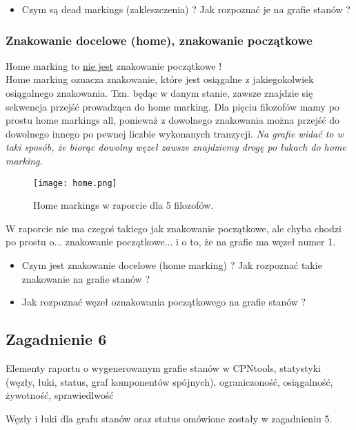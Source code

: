 \documentclass[a4paper,15pt]{article}
\newcommand{\question}[2]{
    \begin{tcolorbox}[colback=black!5!white,colframe=black,title={Zagadnienie #1}]
        #2
    \end{tcolorbox}
}
\begin{document}
\begin{framed}
\begin{itemize}
\item Czym są dead markings (zakleszczenia) ? Jak rozpoznać je na grafie stanów ?
\end{itemize}
\end{framed}


\subsubsection{Znakowanie docelowe (home), znakowanie początkowe}
Home marking to \underline{nie jest} znakowanie początkowe ! \\
Home marking oznacza znakowanie, które jest osiągalne z jakiegokolwiek osiągalnego znakowania. Tzn. będąc w danym stanie, zawsze znajdzie się sekwencja przejść prowadząca do home marking. Dla pięciu filozofów mamy po prostu home markings all, ponieważ z dowolnego znakowania można przejść do dowolnego innego po pewnej liczbie wykonanych tranzycji. \textit{Na grafie widać to w taki sposób, że biorąc dowolny węzeł zawsze znajdziemy drogę po łukach do home marking}.
\begin{figure}[H]
\centerline{\texttt{[image: home.png]}}
\caption{Home markings w raporcie dla 5 filozofów.}
\label{fig:home}
\end{figure}
W raporcie nie ma czegoś takiego jak znakowanie początkowe, ale chyba chodzi po prostu o... znakowanie początkowe... i o to, że na grafie ma węzeł numer 1.

\begin{framed}
\begin{itemize}
\item Czym jest znakowanie docelowe (home marking) ? Jak rozpoznać takie znakowanie na grafie stanów ?
\item Jak rozpoznać węzeł oznakowania początkowego na grafie stanów ?
\end{itemize}
\end{framed}


\newpage
\subsection{Zagadnienie 6}
\question{6}{
Elementy raportu o wygenerowanym grafie stanów w CPNtools, statystyki
(węzły, łuki, status, graf komponentów spójnych), ograniczoność,
osiągalność, żywotność, sprawiedlwość
}

Węzły i łuki dla grafu stanów oraz status omówione zostały w zagadnieniu 5. 
\end{document}
